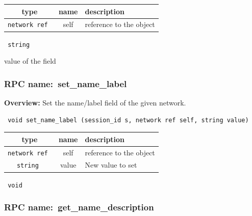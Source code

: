 
 
\vspace{0.3cm}
\begin{tabular}{|c|c|p{7cm}|}
 \hline
{\bf type} & {\bf name} & {\bf description} \\ \hline
{\tt network ref } & self & reference to the object \\ \hline 

\end{tabular}

\vspace{0.3cm}

{\tt 
string
}


value of the field
\vspace{0.3cm}
\vspace{0.3cm}
\vspace{0.3cm}
\subsubsection{RPC name:~set\_name\_label}

{\bf Overview:} 
Set the name/label field of the given network.

\begin{verbatim} void set_name_label (session_id s, network ref self, string value)\end{verbatim}



 
\vspace{0.3cm}
\begin{tabular}{|c|c|p{7cm}|}
 \hline
{\bf type} & {\bf name} & {\bf description} \\ \hline
{\tt network ref } & self & reference to the object \\ \hline 

{\tt string } & value & New value to set \\ \hline 

\end{tabular}

\vspace{0.3cm}

{\tt 
void
}



\vspace{0.3cm}
\vspace{0.3cm}
\vspace{0.3cm}
\subsubsection{RPC name:~get\_name\_description}


